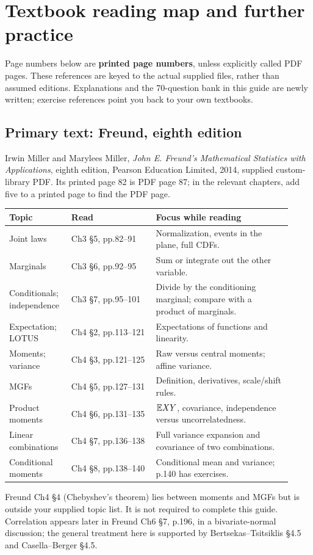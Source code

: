 \section{Textbook reading map and further practice}
\label{sec:references}
Page numbers below are \textbf{printed page numbers}, unless explicitly called PDF pages. These references are keyed to the actual supplied files, rather than assumed editions. Explanations and the 70-question bank in this guide are newly written; exercise references point you back to your own textbooks.

\subsection{Primary text: Freund, eighth edition}
Irwin Miller and Marylees Miller, \emph{John E. Freund's Mathematical Statistics with Applications}, eighth edition, Pearson Education Limited, 2014, supplied custom-library PDF. Its printed page 82 is PDF page 87; in the relevant chapters, add five to a printed page to find the PDF page.

\begin{longtable}{@{}>{\raggedright\arraybackslash}p{0.18\linewidth}>{\raggedright\arraybackslash}p{0.29\linewidth}>{\raggedright\arraybackslash}p{0.45\linewidth}@{}}
\toprule Topic & Read & Focus while reading\\\midrule\endhead
Joint laws & Ch3 \S5, pp.82--91 & Normalization, events in the plane, full CDFs.\\
Marginals & Ch3 \S6, pp.92--95 & Sum or integrate out the other variable.\\
Conditionals; independence & Ch3 \S7, pp.95--101 & Divide by the conditioning marginal; compare with a product of marginals.\\
Expectation; LOTUS & Ch4 \S2, pp.113--121 & Expectations of functions and linearity.\\
Moments; variance & Ch4 \S3, pp.121--125 & Raw versus central moments; affine variance.\\
MGFs & Ch4 \S5, pp.127--131 & Definition, derivatives, scale/shift rules.\\
Product moments & Ch4 \S6, pp.131--135 & $\mathbb E XY$, covariance, independence versus uncorrelatedness.\\
Linear combinations & Ch4 \S7, pp.136--138 & Full variance expansion and covariance of two combinations.\\
Conditional moments & Ch4 \S8, pp.138--140 & Conditional mean and variance; p.140 has exercises.\\\bottomrule
\end{longtable}
Freund Ch4 \S4 (Chebyshev's theorem) lies between moments and MGFs but is outside your supplied topic list. It is not required to complete this guide. Correlation appears later in Freund Ch6 \S7, p.196, in a bivariate-normal discussion; the general treatment here is supported by Bertsekas--Tsitsiklis \S4.5 and Casella--Berger \S4.5.

